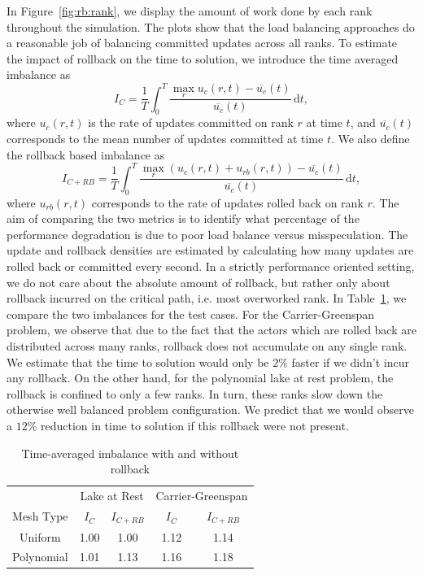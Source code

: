 \documentclass[10pt,letterpaper]{article}
\begin{document}
In Figure~\ref{fig:rb:rank}, we display the amount of work done by each rank throughout the simulation. The plots show that the load balancing approaches do a reasonable job of balancing committed updates across all ranks. To estimate the impact of rollback on the time to solution, we introduce the time averaged imbalance as
\begin{equation*}
I_C = \frac{1}{T}\int_0^T \frac{ \max_r u_c(r, t) - \overline{u_c}(t)}{\overline{u_c}(t) } \,\mathrm{d} t,
\end{equation*}
where $u_c(r,t)$ is the rate of updates committed on rank $r$ at time $t$, and $\overline{u_c}(t)$ corresponds to the mean number of updates committed at time $t$. We also define the rollback based imbalance as
\begin{equation*}
I_{C+RB} = \frac{1}{T} \int_0^T \frac{ \max_r \left(u_c(r,t) + u_{rb}(r,t) \right)- \overline{u_c}(t)}{\overline{u_c}(t) } \,\mathrm{d} t,
\end{equation*}
where $u_{rb}(r,t)$ corresponds to the rate of updates rolled back on rank $r$. The aim of comparing the two metrics is to identify what percentage of the performance degradation is due to poor load balance versus misspeculation. The update and rollback densities are estimated by calculating how many updates are rolled back or committed every second.
In a strictly performance oriented setting, we do not care about the absolute amount of rollback, but rather only about rollback incurred on the critical path, i.e. most overworked rank. In Table~\ref{tab:rb:imb}, we compare the two imbalances for the test cases. For the Carrier-Greenspan problem, we observe that due to the fact that the actors which are rolled back are distributed across many ranks, rollback does not accumulate on any single rank. We estimate that the time to solution would only be $2\%$ faster if we didn't incur any rollback. On the other hand, for the polynomial lake at rest problem, the rollback is confined to only a few ranks. In turn, these ranks slow down the otherwise well balanced problem configuration. We predict that we would observe a $12\%$ reduction in time to solution if this rollback were not present.

\begin{table}
\centering
\begin{tabular}{|c | c c c c|}
\hline & \multicolumn{2}{c}{Lake at Rest} & \multicolumn{2}{c|}{Carrier-Greenspan} \\
Mesh Type& $I_C$ & $I_{C+RB}$ & $I_C$ & $I_{C+RB}$ \\ \hline
Uniform  & 1.00 & 1.00 & 1.12 & 1.14\\ \hline
Polynomial & 1.01 & 1.13 & 1.16 & 1.18\\ \hline
\end{tabular}
\caption{Time-averaged imbalance with and without rollback}
\label{tab:rb:imb}
\end{table}
\end{document}
